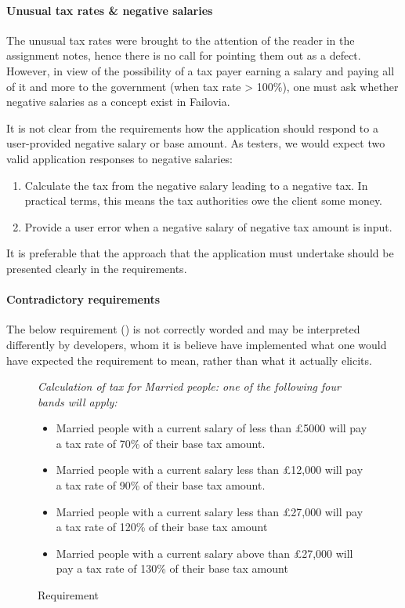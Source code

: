\paragraph{Unusual tax rates \& negative salaries}
The unusual tax rates were brought to the attention of the reader in the assignment notes, hence there is no call for pointing them out as a defect. However, in view of the possibility of a tax payer earning a salary and paying all of it and more to the government (when tax rate > 100\%), one must ask whether negative salaries as a concept exist in Failovia. 
\par
It is not clear from the requirements how the application should respond to a user-provided negative salary or base amount. As testers, we would expect two valid application responses to negative salaries: 

\begin{enumerate}
	\item Calculate the tax from the negative salary leading to a negative tax. In practical terms, this means the tax authorities owe the client some money.
	\item Provide a user error when a negative salary of negative tax amount is input. 
\end{enumerate}

It is preferable that the approach that the application must undertake should be presented clearly in the requirements.

\paragraph{Contradictory requirements}
The below requirement (\REightFive) is not correctly worded and may be interpreted differently by developers, whom it is believe have implemented what one would have expected the requirement to mean, rather than what it actually elicits. 
\par
\begin{figure}[H]
\begin{mdframed}
{
\it
\footnotesize
Calculation of tax for Married people: one of the following four bands will apply:
\begin{itemize}
	\item Married people with a current salary of less than £5000 will pay a tax rate of
	70\% of their base tax amount.
	\item Married people with a current salary less than £12,000 will pay a tax rate of
	90\% of their base tax amount.
	\item Married people with a current salary less than £27,000 will pay a tax rate of
	120\% of their base tax amount
	\item Married people with a current salary above than £27,000 will pay a tax rate
	of 130\% of their base tax amount
\end{itemize}	
}
\end{mdframed}
\caption{Requirement \REightFive}
\end{figure} 


